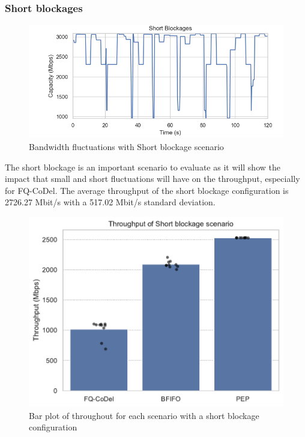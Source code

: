 \documentclass[a4paper,english, 12pt]{report}
\begin{document}
\subsubsection{Short blockages}
\begin{figure}[h!] %
	\centering
	\includegraphics[scale=0.60]{../diagrams/witestlab/sb.png}
  	\caption{Bandwidth fluctuations with Short blockage scenario}
  	\label{fig:sb_fluctuations}
\end{figure}

The short blockage is an important scenario to evaluate as it will show the impact that small and short fluctuations will have on the throughput, especially for FQ-CoDel. The average throughput of the short blockage configuration is 2726.27 Mbit/s with a 517.02 Mbit/s standard deviation.\\


\begin{figure}[!h!] %
	\centering
	\includegraphics[scale=0.70]{../diagrams/witestlab/throughput/throughput_sb.pdf}
  	\caption{Bar plot of throughout for each scenario with a short blockage configuration}
  	\label{fig:throughput_sb}
\end{figure}
\end{document}
